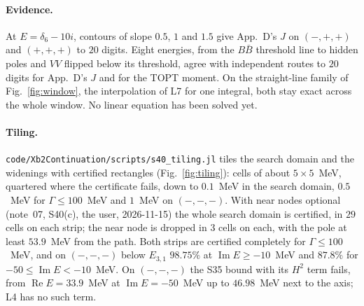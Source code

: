 \documentclass[11pt]{article}
\newcommand{\file}[1]{\nolinkurl{#1}}
\begin{document}
\paragraph{Evidence.} At $E=\delta_6-10i$, contours of slope $0.5$, $1$ and $1.5$ give App.~D's $J$ on $(-,+,+)$ and $(+,+,+)$ to $20$ digits. Eight energies, from the $B\bar B$ threshold line to hidden poles and $VV$ flipped below its threshold, agree with independent routes to $20$ digits for App.~D's $J$ and for the TOPT moment. On the straight-line family of Fig.~\ref{fig:window}, the interpolation of L7 for one integral, both stay exact across the whole window. No linear equation has been solved yet.

\paragraph{Tiling.} \file{code/Xb2Continuation/scripts/s40_tiling.jl} tiles the search domain and the widenings with certified rectangles (Fig.~\ref{fig:tiling}): cells of about $5\times5$~MeV, quartered where the certificate fails, down to $0.1$~MeV in the search domain, $0.5$~MeV for $\Gamma\le100$~MeV and $1$~MeV on $(-,-,-)$. With near nodes optional (note~07, S40(c), the user, 2026-11-15) the whole search domain is certified, in $29$ cells on each strip; the near node is dropped in $3$ cells on each, with the pole at least $53.9$~MeV from the path. Both strips are certified completely for $\Gamma\le100$~MeV, and on $(-,-,-)$ below $E_{3,1}$ $98.75\%$ at $\operatorname{Im}E\ge-10$~MeV and $87.8\%$ for $-50\le\operatorname{Im}E<-10$~MeV. On $(-,-,-)$ the S35 bound with its $H^2$ term fails, from $\operatorname{Re}E=33.9$~MeV at $\operatorname{Im}E=-50$~MeV up to $46.98$~MeV next to the axis; L4 has no such term.
\end{document}
